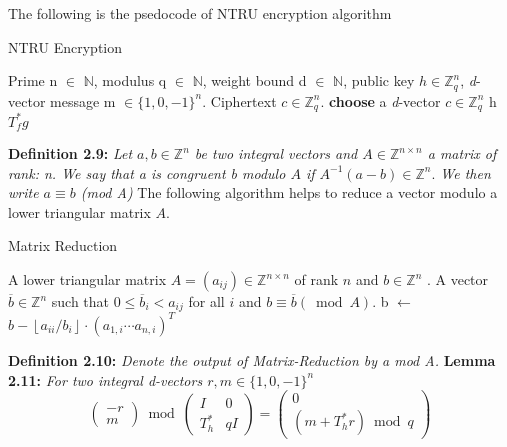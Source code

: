 The following is the psedocode of NTRU encryption algorithm\newline
\begin{algorithm}[h]
        \caption{NTRU Encryption}
        \begin{algorithmic}[1] %
            \Require Prime n $\in$ $\mathbb{N}$, modulus q $\in$ $\mathbb{N}$, weight bound d $\in$ $\mathbb{N}$, public key $h \in \mathbb{Z}_{q}^{n}$, \emph{d}-vector message m $\in\{1,0,-1\}^{n}$.
            \Ensure Ciphertext $c \in \mathbb{Z}_{q}^{n}$.
             \State \textbf{choose} a \emph{d}-vector $c \in \mathbb{Z}_{q}^{n}$
             \State h \leftarrow $T_{f}^{*} g$
             \State {}  
        \end{algorithmic}
    \end{algorithm} 
    \newline
    \newline
\textbf{Definition 2.9: } \emph{Let $a, b \in \mathbb{Z}^{n}$ be two integral vectors and $A \in \mathbb{Z}^{n \times n}$ a matrix of rank: n. We say that a is congruent b modulo $A$ if $A^{-1}(a-b) \in \mathbb{Z}^{n} .$ We then write $a \equiv b$ (mod A)}
\newline
\newline
The following algorithm helps to reduce a vector modulo a lower triangular matrix $A$. 
\begin{algorithm}[h]
        \caption{Matrix Reduction}
        \begin{algorithmic}[1] %
            \Require A lower triangular matrix $A=\left(a_{i j}\right) \in \mathbb{Z}^{n \times n}$ of rank $n$ and $b \in \mathbb{Z}^{n}$ .
            \Ensure A vector $\overline{b} \in \mathbb{Z}^{n}$ such that $0 \leq \overline{b}_{i}<a_{i j}$ for all $i$ and $b \equiv \overline{b}(\bmod A)$. 
                \State b $\leftarrow$ $b-\left\lfloor a_{i i} / b_{i}\right\rfloor \cdot\left(a_{1, i} \cdots a_{n, i}\right)^{T}$
             \EndFor
             \State {}  
        \end{algorithmic}
    \end{algorithm} 

\newline
\newline
\textbf{Definition 2.10: }\emph{Denote the output of Matrix-Reduction by a mod A.}
\newline
\newline
\textbf{Lemma 2.11: }\emph{For two integral d-vectors $r, m \in\{1,0,-1\}^{n}$
\begin{equation}
    \left(\begin{array}{c}{-r} \\ {m}\end{array}\right) \bmod \left(\begin{array}{cc}{I} & {0} \\ {T_{h}^{*}} & {q I}\end{array}\right)=\left(\begin{array}{c}{0} \\ {\left(m+T_{h}^{*} r\right) \bmod q}\end{array}\right)
\end{equation}
}
    

